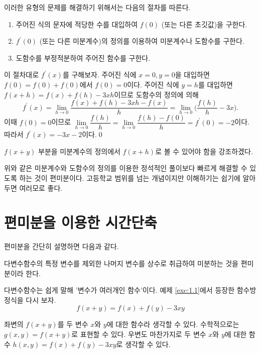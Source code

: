 \documentclass{article}
\begin{document}
\begin{sol}
	이러한 유형의 문제를 해결하기 위해서는 다음의 절차를 따른다.
	\begin{enumerate}
		\item 주어진 식의 문자에 적당한 수를 대입하여 $f(0)$ (또는 다른 초깃값)을 구한다.
		\item $f^\prime(0)$ (또는 다른 미분계수)의 정의를 이용하여 미분계수나 도함수를 구한다.
		\item 도함수를 부정적분하여 주어진 함수를 구한다.
	\end{enumerate}
	이 절차대로 $f^\prime(x)$를 구해보자. 주어진 식에 $x=0,y=0$을 대입하면 $f(0)=f(0)+f(0)$에서 $f(0)=0$이다. 주어진 식에 $y=h$를 대입하면 $f(x+h)=f(x)+f(h)-3xh$이므로 도함수의 정의에 의해
	\[
		f^\prime(x)=\lim\limits_{h\to0}\frac{f(x)+f(h)-3xh-f(x)}{h}=\lim\limits_{h\to0}\biggl(\frac{f(h)}{h}-3x\biggr).
	\]
	이때 $f(0)=0$이므로 $\lim\limits_{h\to0}\dfrac{f(h)}{h}=\lim\limits_{h\to0}\dfrac{f(h)-f(0)}{h}=f^\prime(0)=-2$이다. 따라서 $f^\prime(x)=-3x-2$이다.\qed
\end{sol}

\begin{remark}
	$f(x+y)$ 부분을 미분계수의 정의에서 $f(x+h)$로 볼 수 있어야 함을 강조하겠다.
\end{remark}

위와 같은 미분계수와 도함수의 정의를 이용한 정석적인 풀이보다 빠르게 해결할 수 있도록 하는 것이 편미분이다. 고등학교 범위를 넘는 개념이지만 이해하기는 쉽기에 알아두면 여러모로 좋다.

\section{편미분을 이용한 시간단축}
편미분을 간단히 설명하면 다음과 같다.

\begin{hint}
	다변수함수의 특정 변수를 제외한 나머지 변수를 상수로 취급하여 미분하는 것을 편미분이라 한다.
\end{hint}

다변수함수는 쉽게 말해 '변수가 여러개인 함수'이다. 예제 \ref{exc:1.1}에서 등장한 함수방정식을 다시 보자.
\begin{equation}
	\label{eq:1}
	f(x+y)=f(x)+f(y)-3xy
\end{equation}

좌변의 $f(x+y)$를 두 변수 $x$와 $y$에 대한 함수라 생각할 수 있다. 수학적으로는 $g(x,y)=f(x+y)$로 표현할 수 있다. 우변도 마찬가지로 두 변수 $x$와 $y$에 대한 함수 $h(x,y)=f(x)+f(y)-3xy$로 생각할 수 있다.
\end{document}
